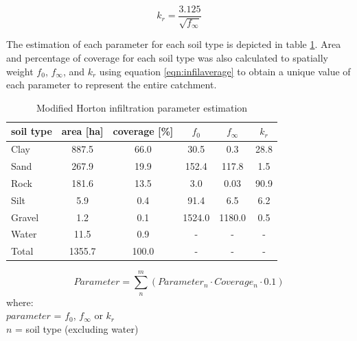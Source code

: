 \begin{equation}
\label{eqn:k_r}
k_r = \frac{3.125}{\sqrt{f_\infty}}
\end{equation}


The estimation of each parameter for each soil type is depicted in table \ref{tbl:infparamest}. Area and percentage of coverage for each soil type was also calculated to spatially weight $f_0$, $f_\infty$, and $k_r$ using equation \ref{eqn:infilaverage} to obtain a unique value of each parameter to represent the entire catchment.


\begin{table}[h]
\caption{Modified Horton infiltration parameter estimation}
\label{tbl:infparamest}
\centering
\begin{tabular}{@{}lccccc@{}}
\toprule
\textbf{soil type} & \textbf{area [ha]} & \textbf{coverage [\%]} & \textbf{$f_0$} & \textbf{$f_\infty$} & \textbf{$k_r$} \\
\midrule
Clay               & 887.5                 & 66.0                       & 30.5          & 0.3                            & 28.8          \\
Sand               & 267.9                 & 19.9                       & 152.4         & 117.8                          & 1.5           \\
Rock               & 181.6                 & 13.5                       & 3.0           & 0.03                            & 90.9          \\
Silt               & 5.9                   & 0.4                        & 91.4          & 6.5                            & 6.2           \\
Gravel             & 1.2                   & 0.1                        & 1524.0        & 1180.0                         & 0.5           \\
Water              & 11.5                  & 0.9                        & -             & -                              & -             \\ \midrule
Total              & 1355.7                & 100.0                      & -             & -                              & - \\           
\bottomrule
\end{tabular}
\end{table}

\begin{equation}
\label{eqn:infilaverage}
Parameter = \sum_{n}^{m}(Parameter_n \cdot Coverage_n \cdot 0.1)
\end{equation}
where: \\
\indent $parameter$ = $f_0$, $f_\infty$ or $k_r$ \\
\indent $n$ = soil type (excluding water) \\

